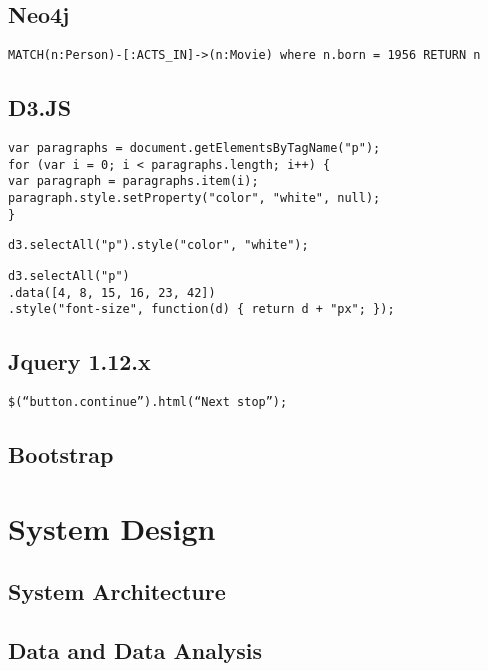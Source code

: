 \section{Neo4j}
\begin{verbatim}
MATCH(n:Person)-[:ACTS_IN]->(n:Movie) where n.born = 1956 RETURN n
\end{verbatim}
\section{D3.JS}
\begin{verbatim}
var paragraphs = document.getElementsByTagName("p");
for (var i = 0; i < paragraphs.length; i++) {
var paragraph = paragraphs.item(i);
paragraph.style.setProperty("color", "white", null);
}
\end{verbatim}
\begin{verbatim}
d3.selectAll("p").style("color", "white");
\end{verbatim}
\begin{verbatim}
d3.selectAll("p")
.data([4, 8, 15, 16, 23, 42])
.style("font-size", function(d) { return d + "px"; });
\end{verbatim}
\section{Jquery 1.12.x}
\begin{verbatim}
$(“button.continue”).html(“Next stop”);
\end{verbatim}
\section{Bootstrap}

\chapter{System Design}
\paragraph{}
\section{System Architecture}
\section{Data and Data Analysis}
